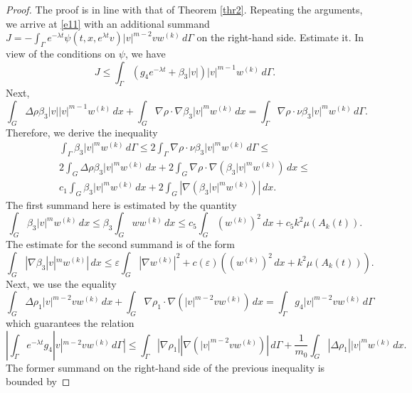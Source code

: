 \documentclass[10pt,a4paper]{amsart}
\begin{document}
\begin{proof}
The proof is in line with that of Theorem \ref{thr2}. Repeating the arguments, we arrive at \eqref{e11} with an additional  summand $J= -\int_{\Gamma}e^{-\lambda t} \psi(t,x,e^{\lambda t}v) |v|^{m-2}v w^{(k)}\,d\Gamma$  on the right-hand side. Estimate it.   
In view of the conditions on  $\psi$, we have 
$$
J\leq \int_\Gamma (g_4e^{-\lambda t}+\beta_3|v|)|v|^{m-1}w^{(k)}\,d\Gamma.
$$
 Next, 
\begin{equation*}
\int_G \Delta\rho \beta_3|v| |v|^{m-1}w^{(k)}\,dx + \int_G \nabla \rho \cdot\nabla \beta_3|v|^{m}w^{(k)}\,dx= \int_{\Gamma}\nabla \rho\cdot \nu 
\beta_3|v|^{m}w^{(k)}\,d\Gamma. 
\end{equation*}
Therefore, we derive the inequality 
\begin{multline*}
 \int_{\Gamma} \beta_3|v|^{m}w^{(k)}\,d\Gamma \leq 
 2\int_{\Gamma}\nabla \rho\cdot \nu \beta_3|v|^{m}w^{(k)}\,d\Gamma\leq  \\
 2\int_G \Delta\rho \beta_3|v|^{m}w^{(k)}\,dx+ 2\int_G \nabla \rho \cdot\nabla (\beta_3|v|^{m}w^{(k)})\,dx\leq \\
c_1 \int_G \beta_3|v|^{m}w^{(k)}\,dx+ 2\int_G |\nabla (\beta_3|v|^{m}w^{(k)})|\,dx.
\end{multline*}
The first summand here is estimated by  the quantity
\begin{equation}\label{w21}
\int_G  \beta_3|v|^{m}w^{(k)}\,dx\leq  \beta_3\int_G w w^{(k)}\,dx\leq c_5\int_G (w^{(k)})^2\,dx+ c_5k^2 \mu(A_k(t)). 
\end{equation}
The estimate for the second summand  is of the form 
\begin{equation}\label{w22}
 \int_G |\nabla \beta_3|v|^{m}w^{(k)}|\,dx\leq  \varepsilon \int_{G} |\nabla w^{(k)}|^2  + c(\varepsilon) ((w^{(k)})^2\,dx +k^2 \mu(A_k(t))).
\end{equation}
Next, we use the equality 
\begin{equation*}
\int_G \Delta\rho_1  |v|^{m-2}v w^{(k)}\,dx+ \int_G \nabla \rho_1 \cdot\nabla (|v|^{m-2}v w^{(k)})\,dx= \int_{\Gamma} g_4 |v|^{m-2} v w^{(k)}\,d\Gamma 
\end{equation*}
which guarantees the relation
\begin{equation*}
 |\int_{\Gamma}e^{-\lambda t} g_4 |v|^{m-2} v w^{(k)}\,d\Gamma|  \leq 
 \int_{\Gamma}|\nabla \rho_1| |\nabla ( |v|^{m-2}v w^{(k)})|\,d\Gamma + \frac{1}{m_0}\int_G |\Delta\rho_1|  |v|^{m} w^{(k)}\,dx.
 \end{equation*}
The former  summand on the right-hand side of the previous inequality is bounded  by 

\end{proof}
\end{document}
